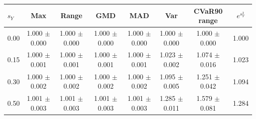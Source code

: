 \begin{tabular}{lccccccc}
\toprule
$s_Y$ & Max & Range & GMD & MAD & Var & CVaR90 range & $e^{s_Y^2}$ \\
\midrule
0.00 & 1.000 $\pm$ 0.000 & 1.000 $\pm$ 0.000 & 1.000 $\pm$ 0.000 & 1.000 $\pm$ 0.000 & 1.000 $\pm$ 0.000 & 1.000 $\pm$ 0.000 & 1.000 \\
0.15 & 1.000 $\pm$ 0.001 & 1.000 $\pm$ 0.001 & 1.000 $\pm$ 0.001 & 1.000 $\pm$ 0.001 & 1.023 $\pm$ 0.002 & 1.074 $\pm$ 0.016 & 1.023 \\
0.30 & 1.000 $\pm$ 0.002 & 1.000 $\pm$ 0.002 & 1.000 $\pm$ 0.002 & 1.000 $\pm$ 0.002 & 1.095 $\pm$ 0.005 & 1.251 $\pm$ 0.042 & 1.094 \\
0.50 & 1.001 $\pm$ 0.003 & 1.001 $\pm$ 0.003 & 1.001 $\pm$ 0.003 & 1.001 $\pm$ 0.003 & 1.285 $\pm$ 0.011 & 1.579 $\pm$ 0.081 & 1.284 \\
\bottomrule
\end{tabular}
